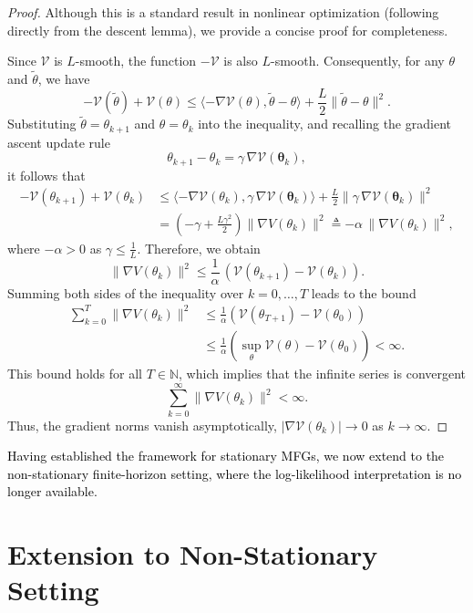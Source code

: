 \documentclass[11pt]{article}
\newcommand{\btheta}{{\boldsymbol \theta}}
\newcommand{\V}{{\mathcal V}}
\newcommand{\tb}[1]{\textcolor{black}{#1}} %
\begin{document}
\begin{proof}
Although this is a standard result in nonlinear optimization (following directly from the descent lemma), we provide a concise proof for completeness.

Since $\V$ is $L$-smooth, the function $-\V$ is also $L$-smooth. Consequently, for any $\theta$ and $\tilde \theta$,  we have 
$$
-\V(\tilde \theta) + \V(\theta) \leq \langle -\nabla \V(\theta), \tilde \theta - \theta \rangle + \frac{L}{2} \|\tilde \theta-\theta\|^2.
$$
Substituting $\tilde{\theta} = \theta_{k+1}$ and $\theta = \theta_k$ into the inequality, and recalling the gradient ascent update rule $$\theta_{k+1} - \theta_k = \gamma \, \nabla \V(\btheta_{k}),$$ it follows that
\begin{align*}
-\V(\theta_{k+1}) + \V(\theta_k) &\leq \langle -\nabla \V(\theta_k), \gamma \, \nabla \V(\btheta_{k}) \rangle + \frac{L}{2} \|\gamma \, \nabla \V(\btheta_{k})\|^2 \\
&= \left( -\gamma + \frac{L \gamma^2}{2} \right) \|\nabla V(\theta_k)\|^2 \triangleq -\alpha \, \|\nabla V(\theta_k)\|^2,
\end{align*} 
where $-\alpha > 0$ as $\gamma \leq \frac{1}{L}$. Therefore, we obtain
$$
\|\nabla V(\theta_k)\|^2 \leq \frac{1}{\alpha} \, (\V(\theta_{k+1}) - \V(\theta_{k})). 
$$
Summing both sides of the inequality over $k = 0, \dots, T$  leads to the bound
\begin{align*}
\sum_{k=0}^T \|\nabla V(\theta_k)\|^2  &\leq \frac{1}{\alpha} \left( \V(\theta_{T+1}) - \V(\theta_{0}) \right) \\ &\leq \frac{1}{\alpha} \left( \sup_{\theta} \V(\theta) - \V(\theta_0) \right) < \infty. 
\end{align*}
This bound holds for all $T \in \mathbb{N}$, which implies that the infinite series is convergent
$$
\sum_{k=0}^{\infty} \|\nabla V(\theta_k)\|^2 < \infty.
$$
Thus, the gradient norms vanish asymptotically, $|\nabla \V(\theta_k)| \to 0$ as $k \to \infty$.
\end{proof}


\tb{Having established the framework for stationary MFGs, we now extend to the non-stationary finite-horizon setting, where the log-likelihood interpretation is no longer available.}

\section{Extension to Non-Stationary Setting}
\end{document}

